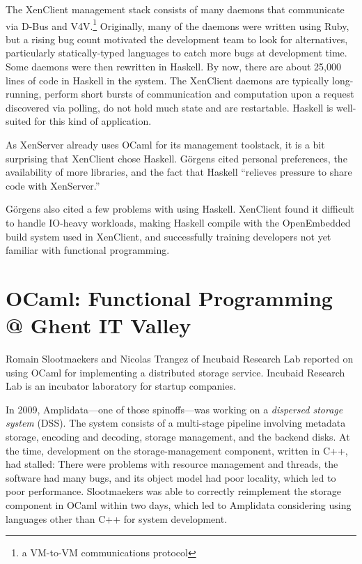 \documentclass{jfp1}
\begin{document}
The XenClient management stack consists of many daemons that communicate
via D-Bus and V4V.\footnote{a VM-to-VM communications protocol}  Originally,
many of the daemons were written using Ruby, but a rising bug count
motivated the development team to look for alternatives, particularly
statically-typed languages to catch more bugs at development time.
Some daemons were then rewritten in Haskell.  By now, there are about
25,000 lines of code in Haskell in the system.  The XenClient daemons are
typically long-running, perform short bursts of communication and
computation upon a request discovered via polling, do not hold much
state and are restartable.  Haskell is well-suited for this kind of
application.

As XenServer already uses OCaml for its management toolstack, it is a
bit surprising that XenClient chose Haskell.  Görgens cited personal
preferences, the availability of more libraries, and the fact that
Haskell ``relieves pressure to share code with XenServer.''

Görgens also cited a few problems with using Haskell.  XenClient found
it difficult to handle IO-heavy workloads, making Haskell compile with
the OpenEmbedded build system used in XenClient, and
successfully training developers not yet familiar with functional
programming.

\section{OCaml: Functional Programming @ Ghent IT Valley}

Romain Slootmaekers and Nicolas Trangez of Incubaid Research Lab
reported on using OCaml for implementing a distributed storage
service.  Incubaid Research Lab is an incubator laboratory for startup
companies.

In 2009, Amplidata---one of those spinoffs---was working on a
\textit{dispersed storage system} (DSS).  The system consists of a
multi-stage pipeline involving metadata storage, encoding and
decoding, storage management, and the backend disks.  At the time,
development on the storage-management component, written in C++, had
stalled: There were problems with resource management and threads, the
software had many bugs, and its object model had poor locality, which
led to poor performance.  Slootmaekers was able to correctly
reimplement the storage component in OCaml within two days, which led
to Amplidata considering using languages other than C++ for system
development.
\end{document}
